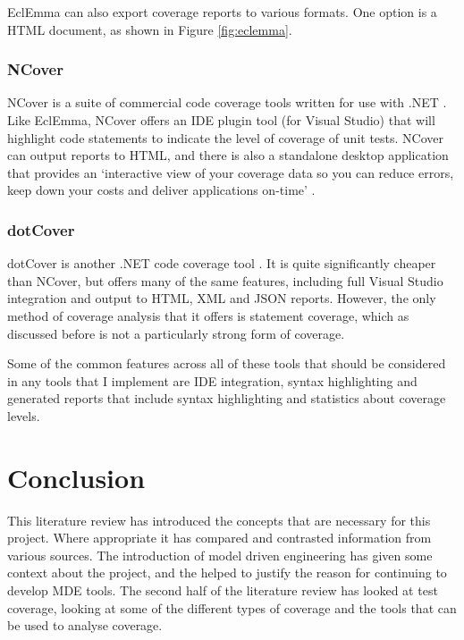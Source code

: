 EclEmma can also export coverage reports to various formats. One option is a HTML document, as shown in Figure \ref{fig:eclemma}.

\subsubsection{NCover}

NCover is a suite of commercial code coverage tools written for use with .NET \citep{NCover}. Like EclEmma, NCover offers an IDE plugin tool (for Visual Studio) that will highlight code statements to indicate the level of coverage of unit tests. NCover can output reports to HTML, and there is also a standalone desktop application that provides an `interactive view of your coverage data so you can reduce errors, keep down your costs and deliver applications on-time' \citep{NCover}. 

\subsubsection{dotCover}

dotCover is another .NET code coverage tool \cite{dotCover}. It is quite significantly cheaper than NCover, but offers many of the same features, including full Visual Studio integration and output to HTML, XML and JSON reports. However, the only method of coverage analysis that it offers is statement coverage, which as discussed before is not a particularly strong form of coverage.

Some of the common features across all of these tools that should be considered in any tools that I implement are IDE integration, syntax highlighting and generated reports that include syntax highlighting and statistics about coverage levels.
\section{Conclusion}

This literature review has introduced the concepts that are necessary for this project. Where appropriate it has compared and contrasted information from various sources. The introduction of model driven engineering has given some context about the project, and the helped to justify the reason for continuing to develop MDE tools. The second half of the literature review has looked at test coverage, looking at some of the different types of coverage and the tools that can be used to analyse coverage.